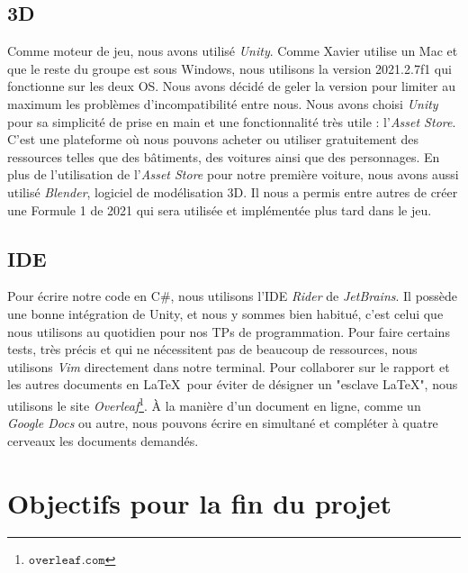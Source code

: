 \documentclass[12pt,a4paper]{article}
\begin{document}
        \clearpage


        \subsection{3D}
            Comme moteur de jeu, nous avons utilisé \textsl{Unity}. Comme Xavier utilise un Mac 
            et que le reste du groupe est sous Windows, nous utilisons la version 2021.2.7f1 qui
            fonctionne sur les deux OS. Nous avons décidé de geler la version pour limiter au
            maximum les problèmes d'incompatibilité entre nous. Nous avons choisi \textsl{Unity}
            pour sa simplicité de prise en main et une fonctionnalité très utile :
            l'\textsl{Asset Store}. C'est une plateforme où nous pouvons acheter ou
            utiliser gratuitement des ressources telles que des bâtiments, des voitures ainsi que
            des personnages. En plus de l'utilisation de l'\textsl{Asset Store} pour notre première
            voiture, nous avons aussi utilisé \textsl{Blender}, logiciel de modélisation 3D. Il
            nous a permis entre autres de créer une Formule 1 de 2021 qui sera utilisée et
            implémentée plus tard dans le jeu.

        \subsection{IDE}
            Pour écrire notre code en C\#, nous utilisons l'IDE \textsl{Rider} de 
            \textsl{JetBrains}. Il possède une bonne intégration de Unity, et nous
            y sommes bien habitué, c'est celui que nous utilisons au quotidien pour
            nos TPs de programmation. Pour faire certains tests, très précis et qui
            ne nécessitent pas de beaucoup de ressources, nous utilisons \textsl{Vim}
            directement dans notre terminal.
            Pour collaborer sur le rapport et les autres documents en \LaTeX\, 
            pour éviter de désigner un "esclave \LaTeX", nous utilisons le site 
            \textsl{Overleaf}\footnote{\(\mathtt{overleaf.com}\)}. 
            À la manière d'un document en ligne, comme 
            un \textsl{Google Docs} ou autre, nous pouvons écrire en
            simultané et compléter à quatre cerveaux les documents demandés.


    \clearpage
    \section{Objectifs pour la fin du projet}
\end{document}
